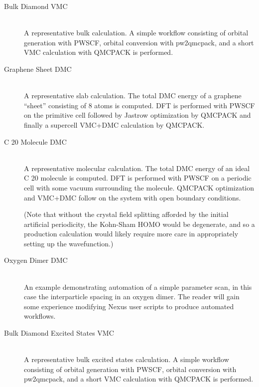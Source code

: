 \documentclass[oneside,11pt]{memoir}
\numberwithin{equation}{section}
\begin{document}
\begin{description}
  \item[Bulk Diamond VMC] \hfill \\
    A representative bulk calculation.  A simple workflow consisting 
    of orbital generation with PWSCF, orbital conversion with pw2qmcpack, 
    and a short VMC calculation with QMCPACK is performed.

  \item[Graphene Sheet DMC] \hfill \\
    A representative slab calculation.  The total DMC energy of a graphene 
    ``sheet'' consisting of 8 atoms is computed.  DFT is performed with 
    PWSCF on the primitive cell followed by Jastrow optimization by QMCPACK 
    and finally a supercell VMC+DMC calculation by QMCPACK.  

  \item[C 20 Molecule DMC] \hfill  \\
    A representative molecular calculation.  The total DMC energy of an ideal 
    C 20 molecule is computed.  DFT is performed with PWSCF on a periodic cell 
    with some vacuum surrounding the molecule.  QMCPACK optimization and 
    VMC+DMC follow on the system with open boundary conditions.  

    (Note that without the crystal field splitting afforded by the initial 
    artificial periodicity, the Kohn-Sham HOMO would be degenerate, and so a 
    production calculation would likely require more care in appropriately 
    setting up the wavefunction.)

  \item[Oxygen Dimer DMC] \hfill \\
    An example demonstrating automation of a simple parameter scan, in this 
    case the interparticle spacing in an oxygen dimer.  The reader will gain 
    some experience modifying Nexus user scripts to produce automated workflows.
    
  \item[Bulk Diamond Excited States VMC] \hfill \\
    A representative bulk excited states calculation.  A simple workflow consisting 
    of orbital generation with PWSCF, orbital conversion with pw2qmcpack, 
    and a short VMC calculation with QMCPACK is performed.
\end{description}
\end{document}
